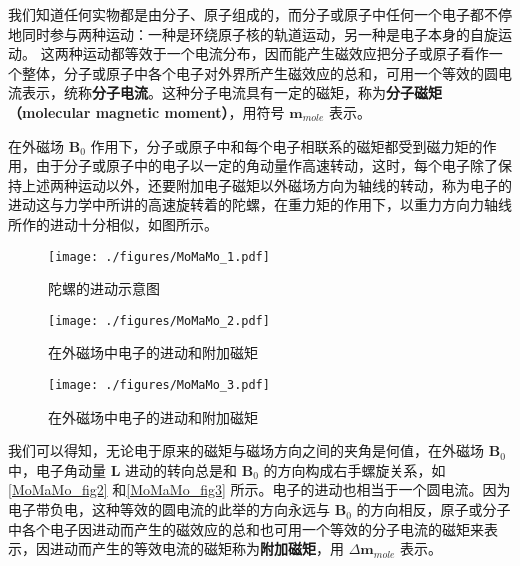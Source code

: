 
我们知道任何实物都是由分子、原子组成的，而分子或原子中任何一个电子都不停地同时参与两种运动：一种是环绕原子核的轨道运动，另一种是电子本身的自旋运动。 这两种运动都等效于一个电流分布，因而能产生磁效应把分子或原子看作一个整体，分子或原子中各个电子对外界所产生磁效应的总和，可用一个等效的圆电流表示，统称\textbf{分子电流}。这种分子电流具有一定的磁矩，称为\textbf{分子磁矩（molecular magnetic moment）}，用符号 $\mathbf m_{mole}$ 表示。

在外磁场 $\mathbf B_0$ 作用下，分子或原子中和每个电子相联系的磁矩都受到磁力矩的作用，由于分子或原子中的电子以一定的角动量作高速转动，这时，每个电子除了保持上述两种运动以外，还要附加电子磁矩以外磁场方向为轴线的转动，称为电子的进动这与力学中所讲的高速旋转着的陀螺，在重力矩的作用下，以重力方向力轴线所作的进动十分相似，如图所示。
\begin{figure}[ht]
\centering
\texttt{[image: ./figures/MoMaMo\_1.pdf]}
\caption{陀螺的进动示意图} \label{MoMaMo_fig1}
\end{figure}
\begin{figure}[ht]
\centering
\texttt{[image: ./figures/MoMaMo\_2.pdf]}
\caption{在外磁场中电子的进动和附加磁矩} \label{MoMaMo_fig2}
\end{figure}
\begin{figure}[ht]
\centering
\texttt{[image: ./figures/MoMaMo\_3.pdf]}
\caption{在外磁场中电子的进动和附加磁矩} \label{MoMaMo_fig3}
\end{figure}

我们可以得知，无论电于原来的磁矩与磁场方向之间的夹角是何值，在外磁场 $\mathbf B_0$ 中，电子角动量 $\mathbf L$ 进动的转向总是和 $\mathbf B_0$ 的方向构成右手螺旋关系，如\autoref{MoMaMo_fig2} 和\autoref{MoMaMo_fig3} 所示。电子的进动也相当于一个圆电流。因为电子带负电，这种等效的圆电流的此举的方向永远与 $\mathbf B_0$ 的方向相反，原子或分子中各个电子因进动而产生的磁效应的总和也可用一个等效的分子电流的磁矩来表示，因进动而产生的等效电流的磁矩称为\textbf{附加磁矩}，用 $\Delta\mathbf m_{mole}$ 表示。
